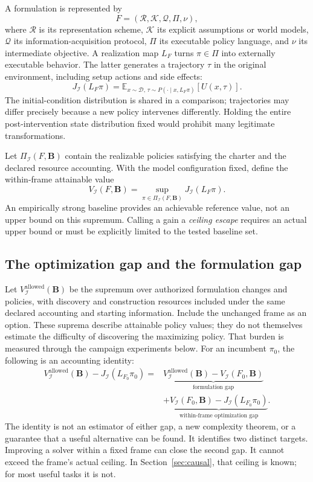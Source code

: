 \documentclass[11pt,letterpaper]{article}
\newcommand{\E}{\mathbb E}
\newcommand{\I}{\mathcal I}
\newcommand{\D}{\mathcal D}
\theoremstyle{remark}\newtheorem{remark}{Remark}[section]
\begin{document}
A formulation is represented by
\begin{equation}
F=(\mathcal R,\mathcal K,\mathcal Q,\Pi,\nu),\label{eq:frame}
\end{equation}
where $\mathcal R$ is its representation scheme, $\mathcal K$ its explicit assumptions or world models, $\mathcal Q$ its information-acquisition protocol, $\Pi$ its executable policy language, and $\nu$ its intermediate objective. A realization map $L_F$ turns $\pi\in\Pi$ into externally executable behavior. The latter generates a trajectory $\tau$ in the original environment, including setup actions and side effects:
\begin{equation}
J_\I(L_F\pi)=\E_{x\sim\D,\,\tau\sim P(\cdot\mid x,L_F\pi)}[U(x,\tau)].\label{eq:value}
\end{equation}
The initial-condition distribution is shared in a comparison; trajectories may differ precisely because a new policy intervenes differently. Holding the entire post-intervention state distribution fixed would prohibit many legitimate transformations.

Let $\Pi_\I(F,\mathbf B)$ contain the realizable policies satisfying the charter and the declared resource accounting. With the model configuration fixed, define the within-frame attainable value
\begin{equation}
V_\I(F,\mathbf B)=\sup_{\pi\in\Pi_\I(F,\mathbf B)}J_\I(L_F\pi).\label{eq:frame-value}
\end{equation}
An empirically strong baseline provides an achievable reference value, not an upper bound on this supremum. Calling a gain a \emph{ceiling escape} requires an actual upper bound or must be explicitly limited to the tested baseline set.

\subsection{The optimization gap and the formulation gap}
Let $V_\I^{\mathrm{allowed}}(\mathbf B)$ be the supremum over authorized formulation changes and policies, with discovery and construction resources included under the same declared accounting and starting information. Include the unchanged frame as an option. These suprema describe attainable policy values; they do not themselves estimate the difficulty of discovering the maximizing policy. That burden is measured through the campaign experiments below. For an incumbent $\pi_0$, the following is an accounting identity:
\begin{align}
V_\I^{\mathrm{allowed}}(\mathbf B)-J_\I(L_{F_0}\pi_0)
={}&\underbrace{V_\I^{\mathrm{allowed}}(\mathbf B)-V_\I(F_0,\mathbf B)}_{\text{formulation gap}}\nonumber\\
&+\underbrace{V_\I(F_0,\mathbf B)-J_\I(L_{F_0}\pi_0)}_{\text{within-frame optimization gap}}.\label{eq:gaps}
\end{align}
The identity is not an estimator of either gap, a new complexity theorem, or a guarantee that a useful alternative can be found. It identifies two distinct targets. Improving a solver within a fixed frame can close the second gap. It cannot exceed the frame's actual ceiling. In Section~\ref{sec:causal}, that ceiling is known; for most useful tasks it is not.
\end{document}
